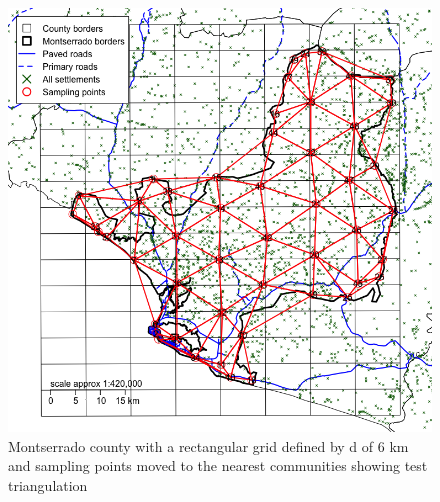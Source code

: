\documentclass[12pt,a4paper]{book}
\theoremstyle{definition}
\theoremstyle{definition}
\theoremstyle{definition}
\theoremstyle{remark}
\begin{document}
\begin{figure}[H]

{\centering \includegraphics{figures/grid3a-1} 

}

\caption{Montserrado county with a rectangular grid defined by d of 6 km and sampling points moved to the nearest communities showing test triangulation}\label{fig:grid3a}
\end{figure}
\end{document}
